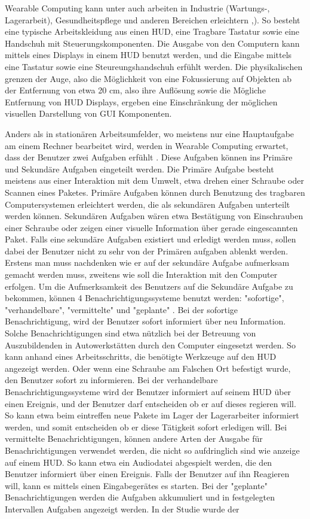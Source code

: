 Wearable Computing kann unter auch arbeiten in Industrie (Wartungs-, Lagerarbeit), Gesundheitspflege und anderen Bereichen erleichtern \cite{Witt:2006hi},\cite{Lawo:2008gg}). So besteht eine typische Arbeitskleidung aus einen HUD, eine Tragbare Tastatur sowie eine Handschuh mit Steuerungskomponenten. Die Ausgabe von den Computern kann mittels eines Displays in einem HUD benutzt werden, und die Eingabe mittels eine Tastatur sowie eine Steureungshandschuh erfühlt werden. Die physikalischen grenzen der Auge, also die Möglichkeit von eine Fokussierung auf Objekten ab der Entfernung von etwa 20 cm, also ihre Auflösung sowie die Mögliche Entfernung von HUD Displays, ergeben eine Einschränkung der möglichen visuellen Darstellung von GUI Komponenten. 

Anders als in stationären Arbeitsumfelder, wo meistens nur eine Hauptaufgabe am einem Rechner bearbeitet wird, werden in Wearable Computing erwartet, dass der Benutzer zwei Aufgaben erfühlt \cite{Witt:2006hi}. Diese Aufgaben können ins Primäre und Sekundäre Aufgaben eingeteilt werden. Die Primäre Aufgabe besteht meistens aus einer Interaktion mit dem Umwelt, etwa drehen einer Schraube oder Scannen eines Paketes. Primäre Aufgaben können durch Benutzung des tragbaren Computersystemen erleichtert werden, die als sekundären Aufgaben unterteilt werden können. Sekundären Aufgaben wären etwa Bestätigung von Einschrauben einer Schraube oder zeigen einer visuelle Information über gerade eingescannten Paket. Falls eine sekundäre Aufgaben existiert und erledigt werden muss, sollen dabei der Benutzer nicht zu sehr von der Primären aufgaben ablenkt werden. Erstens man muss nachdenken wie er auf der sekundäre Aufgabe aufmerksam gemacht werden muss, zweitens wie soll die Interaktion mit den Computer erfolgen. Um die Aufmerksamkeit des Benutzers auf die Sekundäre Aufgabe zu bekommen, können 4 Benachrichtigungssysteme benutzt werden: "sofortige", "verhandelbare", "vermittelte" und "geplante" \cite{McFarlane:1999um}\cite{Nilsson:cq}. Bei der sofortige Benachrichtigung, wird der Benutzer sofort informiert über neu Information. Solche Benachrichtigungen sind etwa nützlich bei der Betreuung von Auszubildenden in Autowerkstätten durch den Computer eingesetzt werden. So kann anhand eines Arbeitsschritts, die benötigte Werkzeuge auf den HUD angezeigt werden. Oder wenn eine Schraube am Falschen Ort befestigt wurde, den Benutzer sofort zu informieren. Bei der verhandelbare Benachrichtigungssysteme wird der Benutzer informiert auf seinem HUD über einen Ereignis, und der Benutzer darf entscheiden ob er auf dieses regieren will. So kann etwa beim eintreffen neue Pakete im Lager der Lagerarbeiter informiert werden, und somit entscheiden ob er diese Tätigkeit sofort erledigen will. Bei vermittelte Benachrichtigungen, können andere Arten der Ausgabe für Benachrichtigungen verwendet werden, die nicht so aufdringlich sind wie anzeige auf einem HUD. So kann etwa ein Audiodatei abgespielt werden, die den Benutzer informiert über einen Ereignis. Falls der Benutzer auf ihn Reagieren will, kann es mittels einen Eingabegerätes es starten. Bei der "geplante" Benachrichtigungen werden die Aufgaben  akkumuliert und in festgelegten Intervallen Aufgaben angezeigt werden. In der Studie \cite{Nilsson:cq} wurde der 